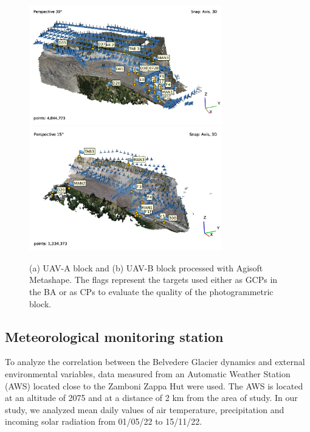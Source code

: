 \begin{figure}
  \begin{center}
    \includegraphics[width=84mm]{2_UAV-A_280722.png}
     \\ \vspace{1mm}
    \includegraphics[width=84mm]{2_UAV-B_050822.png}
  \end{center}
  \caption{(a) UAV-A block and (b) UAV-B block processed with Agisoft Metashape. The
    flags represent the targets used either as GCPs in the BA or as CPs to evaluate the
    quality of the photogrammetric block.}
  \label{fig:uavblocks}
\end{figure}

\subsection{Meteorological monitoring station}\label{sec:meteostation}

To analyze the correlation between the Belvedere Glacier dynamics and
external environmental variables, data measured from an Automatic Weather Station (AWS)
located close to the Zamboni Zappa Hut were used.
The AWS is located at an altitude of \SI{2075}{\masl} and at a distance of
2 km from the area of study.
In our study, we analyzed mean daily values of air temperature, precipitation and
incoming solar radiation from 01/05/22 to 15/11/22.

